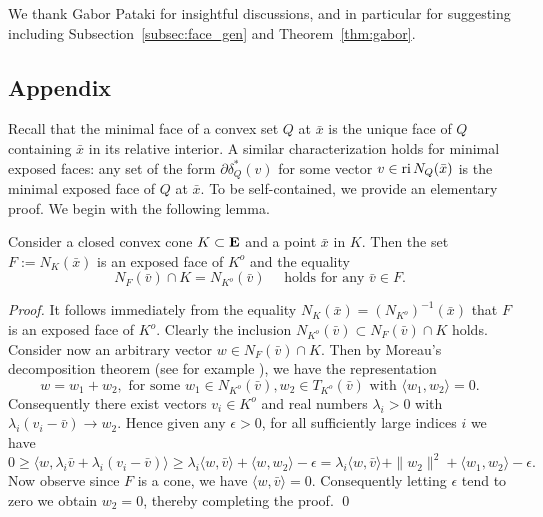\documentclass[smallextended,numbook]{svjour3}
\begin{document}
\begin{acknowledgement} We thank Gabor Pataki for insightful discussions, and in particular for suggesting including Subsection~\ref{subsec:face_gen} and Theorem~\ref{thm:gabor}.

\end{acknowledgement}





\begin{appendices}
\section{Appendix}
Recall that the minimal face of a convex set $Q$ at $\bar{x}$ is the unique face of $Q$ containing $\bar{x}$ in its relative interior.
A similar characterization holds for minimal exposed faces: any set of the form $\partial\delta^*_Q(v)$ for some vector $v\in{\mbox{\rm ri}\,} N_Q(\bar{x})$ is the minimal exposed face of $Q$ at $\bar{x}$. To be self-contained, we provide an elementary proof. We begin with the following lemma.
\begin{lem}\label{lem:key} 
Consider a closed convex cone $K\subset{{\bf E}}$ and a point $\bar{x}$ in $K$. Then the set $F:=N_K(\bar{x})$ is an exposed face of $K^{o}$ and the equality
$$N_F(\bar{v})\cap K = N_{K^{o}}(\bar{v})\quad\textrm{ holds for any } \bar{v}\in F.$$ 
\end{lem}
\begin{proof}
It follows immediately from the equality $N_K(\bar{x})=(N_{K^{o}})^{-1}(\bar{x})$ that $F$ is an exposed face of $K^{o}$. Clearly the inclusion $N_{K^{o}}(\bar{v})\subset N_F(\bar{v})\cap K$ holds. Consider now an arbitrary vector $w\in N_F(\bar{v})\cap K$. Then by Moreau's decomposition theorem (see for example \cite{Moreau}), we have the representation
$$w= w_1+w_2, \textrm{ for some } w_1\in N_{K^{o}}(\bar{v}), w_2\in T_{K^{o}}(\bar{v}) \textrm{ with } \langle w_1,w_2\rangle=0.$$
Consequently there exist vectors $v_i\in K^{o}$ and real numbers $\lambda_i >0$ with $\lambda_i(v_i-\bar{v})\to w_2$. Hence given any $\epsilon >0$, for all sufficiently large indices $i$ we have
$$0 \geq \langle w,  \lambda_i\bar{v}+ \lambda_i (v_i-\bar{v})\rangle\geq \lambda_i \langle w,\bar{v}\rangle + \langle w,w_2\rangle -\epsilon= \lambda_i \langle w,\bar{v}\rangle+\|w_2\|^2+\langle w_1,w_2\rangle-\epsilon.$$
Now observe since $F$ is a cone, we have $\langle w,\bar{v}\rangle =0$. Consequently letting $\epsilon$ tend to zero we obtain $w_2=0$, thereby completing the proof. \qed
\end{proof}


\end{appendices}
\end{document}
